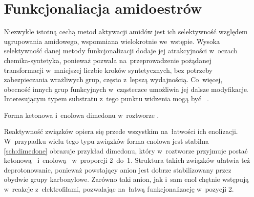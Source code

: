 \section{Funkcjonaliacja amidoestrów}\label{synthesis:amidoesters}


Niezwykle istotną cechą metod aktywacji amidów jest ich selektywność
  względem ugrupowania amidowego, wspomniana wielokrotnie we~wstępie.
Wysoka selektywność danej metody funkcjonalizacji dodaje jej atrakcyjności w~oczach
  chemika-syntetyka, ponieważ pozwala na~przeprowadzenie pożądanej transformacji
  w~mniejszej liczbie kroków syntetycznych, bez potrzeby zabezpieczania wrażliwych grup,
  często z~lepszą wydajnością.
Co~więcej, obecność innych grup funkcyjnych w~cząsteczce umożliwia jej dalsze modyfikacje.
Interesującym typem substratu z~tego punktu widzenia mogą być
  ~.

\begin{marginscheme}
  
  \caption{Forma ketonowa i~enolowa dimedonu w~roztworze .}
  \label{sch:dimedone}
\end{marginscheme}
Reaktywność związków  opiera się przede wszystkim na~łatwości
  ich enolizacji.
W~przypadku wielu tego typu związków forma enolowa jest stabilna \---
  \cref{sch:dimedone} obrazuje przykład dimedonu, który w~roztworze  przyjmuje postać ketonową~
  i~enolową~ w~proporcji 2~do~1.
Struktura takich związków ułatwia też deprotonowanie, ponieważ powstający anion jest
  dobrze stabilizowany przez obydwie grupy karbonylowe.
Zarówno taki anion, jak i~sam enol chętnie wstępują w~reakcje z~elektrofilami,
  pozwalając na~łatwą funkcjonalizację w~pozycji 2.

